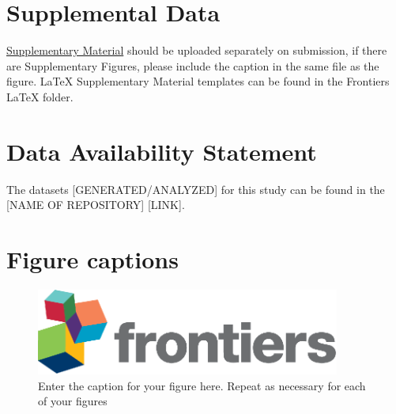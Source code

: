 \documentclass[utf8]{frontiersSCNS}
\begin{document}
\section*{Supplemental Data}
 \href{http://home.frontiersin.org/about/author-guidelines#SupplementaryMaterial}{Supplementary Material} should be uploaded separately on submission, if there are Supplementary Figures, please include the caption in the same file as the figure. LaTeX Supplementary Material templates can be found in the Frontiers LaTeX folder.

\section*{Data Availability Statement}
The datasets [GENERATED/ANALYZED] for this study can be found in the [NAME OF REPOSITORY] [LINK].


 


\section*{Figure captions}


\begin{figure}[h!]
\begin{center}
\includegraphics[width=10cm]{logo1}%
\end{center}
\caption{ Enter the caption for your figure here.  Repeat as  necessary for each of your figures}\label{fig:1}
\end{figure}
\end{document}
